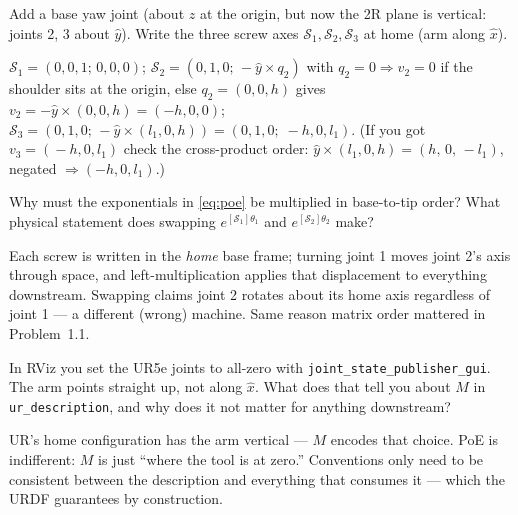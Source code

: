 \begin{problem}
Add a base yaw joint (about $\hat z$ at the origin, but now the 2R plane is vertical: joints
2, 3 about $\hat y$). Write the three screw axes $\mathcal S_1, \mathcal S_2, \mathcal S_3$ at
home (arm along $\hat x$).
\end{problem}
\begin{answer}
$\mathcal S_1 = (0,0,1;\,0,0,0)$;
$\mathcal S_2 = (0,1,0;\, -\hat y \times q_2)$ with $q_2 = 0 \Rightarrow v_2 = 0$ if the
shoulder sits at the origin, else $q_2=(0,0,h)$ gives $v_2 = -\hat y \times (0,0,h) = (-h,0,0)$;
$\mathcal S_3 = (0,1,0;\, -\hat y \times (l_1,0,h)) = (0,1,0;\; -h, 0, l_1)$.
(If you got $v_3 = (\!-h,0,l_1\!)$ check the cross-product order:
$\hat y \times (l_1,0,h) = (h,\,0,\,-l_1)$, negated $\Rightarrow (-h, 0, l_1)$.) \qedhere
\end{answer}

\begin{problem}
Why must the exponentials in \eqref{eq:poe} be multiplied in base-to-tip order? What physical
statement does swapping $e^{[\mathcal S_1]\theta_1}$ and $e^{[\mathcal S_2]\theta_2}$ make?
\end{problem}
\begin{answer}
Each screw is written in the \emph{home} base frame; turning joint 1 moves joint 2's axis
through space, and left-multiplication applies that displacement to everything downstream.
Swapping claims joint 2 rotates about its home axis regardless of joint 1 --- a different
(wrong) machine. Same reason matrix order mattered in Problem~1.1.
\end{answer}

\begin{problem}
In RViz you set the UR5e joints to all-zero with \texttt{joint\_state\_publisher\_gui}. The
arm points straight up, not along $\hat x$. What does that tell you about $M$ in
\texttt{ur\_description}, and why does it not matter for anything downstream?
\end{problem}
\begin{answer}
UR's home configuration has the arm vertical --- $M$ encodes that choice. PoE is indifferent:
$M$ is just ``where the tool is at zero.'' Conventions only need to be consistent between the
description and everything that consumes it --- which the URDF guarantees by construction.
\end{answer}
